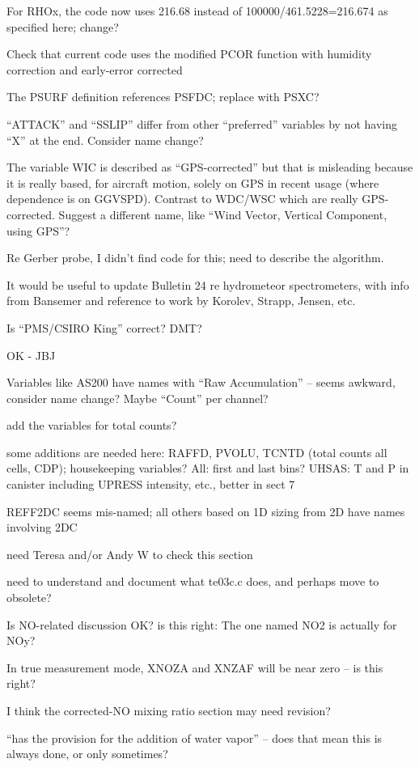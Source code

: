 \documentclass[
]{book}
\begin{document}
For RHOx, the code now uses 216.68 instead of 100000/461.5228=216.674 as specified here; change?

Check that current code uses the modified PCOR function with humidity correction and early-error corrected

The PSURF definition references PSFDC; replace with PSXC?

``ATTACK'' and ``SSLIP'' differ from other ``preferred'' variables by not having ``X'' at the end. Consider name change?

The variable WIC is described as ``GPS-corrected'' but that is misleading because it is really based, for aircraft motion, solely on GPS in recent usage (where dependence is on GGVSPD). Contrast to WDC/WSC which are really GPS-corrected. Suggest a different name, like ``Wind Vector, Vertical Component, using GPS''?

Re Gerber probe, I didn't find code for this; need to describe the algorithm.

It would be useful to update Bulletin 24 re hydrometeor spectrometers, with info from Bansemer and reference to work by Korolev, Strapp, Jensen, etc.

Is ``PMS/CSIRO King'' correct? DMT?

OK - JBJ

Variables like AS200 have names with ``Raw Accumulation'' -- seems awkward, consider name change? Maybe ``Count'' per channel?

add the variables for total counts?

some additions are needed here: RAFFD, PVOLU, TCNTD (total counts all cells, CDP); housekeeping variables? All: first and last bins? UHSAS: T and P in canister including UPRESS intensity, etc., better in sect 7

REFF2DC seems mis-named; all others based on 1D sizing from 2D have names involving 2DC

need Teresa and/or Andy W to check this section

need to understand and document what te03c.c does, and perhaps move to obsolete?

Is NO-related discussion OK? is this right: The one named NO2 is actually for NOy?

In true measurement mode, XNOZA and XNZAF will be near zero -- is this right?

I think the corrected-NO mixing ratio section may need revision?

``has the provision for the addition of water vapor'' -- does that mean this is always done, or only sometimes?
\end{document}
